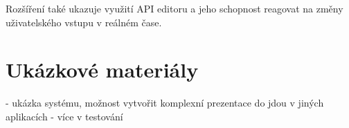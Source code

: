 Rozšíření také ukazuje využití API editoru a jeho schopnost reagovat na změny uživatelského vstupu v reálném čase.











\section{Ukázkové materiály}\label{text:realizace/vytvoreneMaterialy}

- ukázka systému, možnost vytvořit komplexní prezentace do jdou v jiných aplikacích
- více v testování